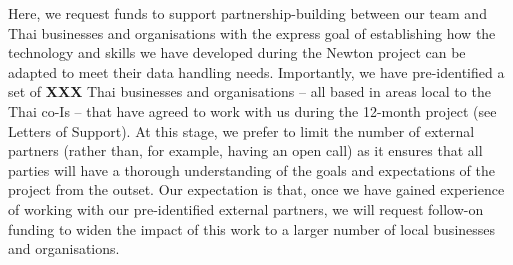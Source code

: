 \documentclass[11pt]{article}
\begin{document}
\vspace{2mm}
\noindent
Here, we request funds to support partnership-building between our team and Thai businesses and organisations with the express goal of establishing how the technology and skills we have developed during the Newton project can be adapted to meet their data handling needs. Importantly, we have pre-identified a set of {\bf XXX} Thai businesses and organisations -- all based in areas local to the Thai co-Is -- that have agreed to work with us during the 12-month project (see Letters of Support). At this stage, we prefer to limit the number of external partners (rather than, for example, having an open call) as it ensures that all parties will have a thorough understanding of the goals and expectations of the project from the outset. Our expectation is that, once we have gained experience of working with our pre-identified external partners, we will request follow-on funding to widen the impact of this work to a larger number of local businesses and organisations.
\end{document}
